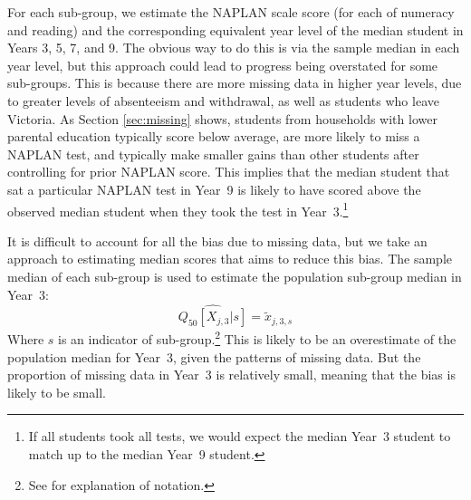 For each sub-group, we estimate the NAPLAN scale score (for each of numeracy and reading) and the corresponding equivalent year level of the median student in Years 3, 5, 7, and 9. The obvious way to do this is via the sample median in each year level, but this approach could lead to progress being overstated for some sub-groups. This is because there are more missing data in higher year levels, due to greater levels of absenteeism and withdrawal, as well as students who leave Victoria. As Section \ref{sec:missing} shows, students from households with lower parental education typically score below average, are more likely to miss a NAPLAN test, and typically make smaller gains than other students after controlling for prior NAPLAN score. This implies that the median student that sat a particular NAPLAN test in \mbox{Year 9} is likely to have scored above the observed median student when they took the test in \mbox{Year 3}.\footnote{If all students took all tests, we would expect the median \mbox{Year 3} student to match up to the median \mbox{Year 9} student.}

It is difficult to account for all the bias due to missing data, but we take an approach to estimating median scores that aims to reduce this bias. The sample median of each sub-group is used to estimate the population sub-group median in \mbox{Year 3}:
\begin{equation}
\widehat{Q_{50}\left[X_{j,3}|s\right]} = \tilde{x}_{j,3,s}
\end{equation}
Where $s$ is an indicator of sub-group.\footnote{See  for explanation of notation.} This is likely to be an overestimate of the population median for \mbox{Year 3}, given the patterns of missing data. But the proportion of missing data in \mbox{Year 3} is relatively small, meaning that the bias is likely to be small.

